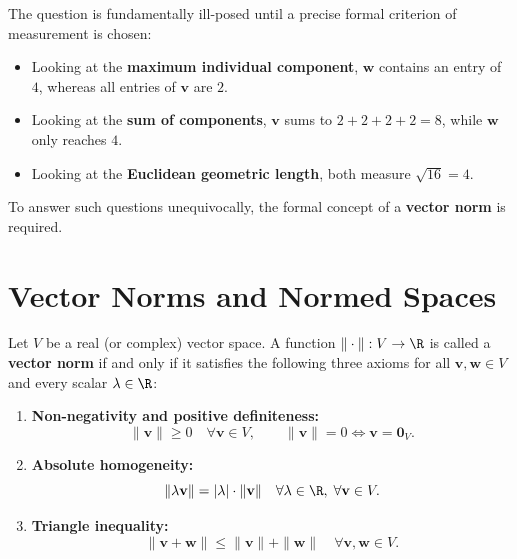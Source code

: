 The question is fundamentally ill-posed until a precise formal criterion of measurement is chosen:
\begin{itemize}
    \item Looking at the \textbf{maximum individual component}, $\mathbf{w}$ contains an entry of $4$, whereas all entries of $\mathbf{v}$ are $2$.
    \item Looking at the \textbf{sum of components}, $\mathbf{v}$ sums to $2 + 2 + 2 + 2 = 8$, while $\mathbf{w}$ only reaches $4$.
    \item Looking at the \textbf{Euclidean geometric length}, both measure $\sqrt{16} = 4$.
\end{itemize}

To answer such questions unequivocally, the formal concept of a \textbf{vector norm} is required.

\FloatBarrier
\section{Vector Norms and Normed Spaces}

\begin{definition}
Let $V$ be a real (or complex) vector space. A function $\|\cdot\|: V \to \R$ is called a \textbf{vector norm} if and only if it satisfies the following three axioms for all $\mathbf{v}, \mathbf{w} \in V$ and every scalar $\lambda \in \R$:
\begin{enumerate}
    \item \textbf{Non-negativity and positive definiteness:}
    \begin{equation}
        \|\mathbf{v}\| \ge 0 \quad \forall \mathbf{v} \in V, \qquad \|\mathbf{v}\| = 0 \iff \mathbf{v} = \mathbf{0}_V.
    \end{equation}
    \item \textbf{Absolute homogeneity:}
    \begin{equation}
        \|\lambda \mathbf{v}\| = |\lambda| \cdot \|\mathbf{v}\| \quad \forall \lambda \in \R, \; \forall \mathbf{v} \in V.
    \end{equation}
    \item \textbf{Triangle inequality:}
    \begin{equation}
        \|\mathbf{v} + \mathbf{w}\| \le \|\mathbf{v}\| + \|\mathbf{w}\| \quad \forall \mathbf{v}, \mathbf{w} \in V.
    \end{equation}
\end{enumerate}
\end{definition}

